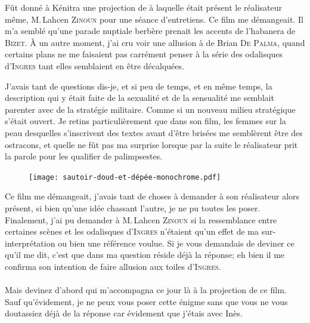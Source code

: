 \begin{prose}
  Fût donné à Kénitra une projection de  à laquelle était présent le réalisateur même, M.\,Lahcen \textsc{Zinoun} pour une séance d’entretiens. Ce film me démangeait. Il m’a semblé qu’une parade nuptiale berbère prenait les accents de l’habanera  de \textsc{Bizet}. À un autre moment, j’ai cru voir une allusion à  de Brian \textsc{De Palma}, quand certains plans ne me faisaient pas carrément penser à la série des odalisques d’\textsc{Ingres} tant elles semblaient en être décalquées.

  J’avais tant de questions dis-je, et si peu de temps, et en même temps, la description qui y était faite de la sexualité et de la sensualité me semblait parenter avec de la stratégie militaire. Comme si un nouveau milieu stratégique s’était ouvert. Je retins particulièrement que dans son film, les femmes sur la peau desquelles s’inscrivent des textes avant d’être brisées me semblèrent être des ostracons, et quelle ne fût pas ma surprise lorsque par la suite le réalisateur prit la parole pour les qualifier de palimpsestes.

\begin{figure}[h]
  \centering
  \texttt{[image: sautoir-doud-et-dépée-monochrome.pdf]}
  \captionsetup{labelformat=empty}
  \caption[Oud et épée ulfberht passés en sautoir]{}
   
\end{figure}

  Ce film me démangeait, j’avais tant de choses à demander à son réalisateur alors présent, si bien qu’une idée chassant l’autre, je ne pu toutes les poser. Finalement, j’ai pu demander à M.\,Lahcen \textsc{Zinoun} si la ressemblance entre certaines scènes et les odalisques d’\textsc{Ingres} n’étaient qu’un effet de ma sur-interprétation ou bien une référence voulue. Si je vous demandais de deviner ce qu’il me dit, c’est que dans ma question réside déjà la réponse; eh bien il me confirma son intention de faire allusion aux toiles d’\textsc{Ingres}.

  \paragraph{}
  Mais devinez d’abord qui m’accompagna ce jour là à la projection de ce film. Sauf qu’évidement, je ne peux vous poser cette énigme sans que vous ne vous doutassiez déjà de la réponse car évidement que j’étais avec Inès.
\end{prose}

